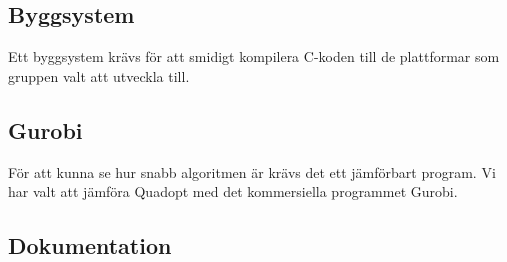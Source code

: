 \begin{LIPSaktivitetslista}
\end{LIPSaktivitetslista}

\subsection{Byggsystem}
Ett byggsystem krävs för att smidigt kompilera C-koden till de plattformar som gruppen valt att utveckla till.
\begin{LIPSaktivitetslista}
\end{LIPSaktivitetslista}

\subsection{Gurobi}
För att kunna se hur snabb algoritmen är krävs det ett jämförbart program. Vi har valt att jämföra Quadopt med det kommersiella programmet Gurobi.
\begin{LIPSaktivitetslista}
\end{LIPSaktivitetslista}

\subsection{Dokumentation}
\begin{LIPSaktivitetslista}
\end{LIPSaktivitetslista}
